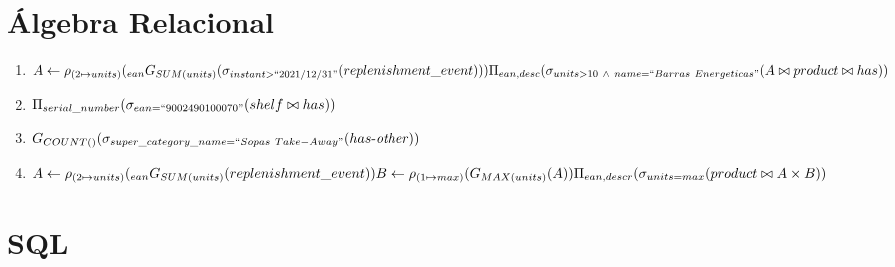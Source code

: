 \documentclass{article}
\newcommand{\select}{\sigma}
\newcommand{\project}{\Pi}
\newcommand{\njoin}{\bowtie}
\newcommand{\rename}{\rho}
\newcommand{\aggregatefn}{\mbox{$G$}}
\begin{document}
	\pagebreak

	\section*{Álgebra Relacional}

	\newcommand\responsiblefor{\mathop{\mbox{$responsible$-$\mathit{for}$}}}
	\newcommand\hasother{\mathop{\mbox{$has$-$\mathit{other}$}}}

	\begin{enumerate}[label=\arabic*)]

		\item $A \leftarrow \rename_{(2 \mapsto units)}(_{ean} \aggregatefn_{SUM(units)}(\select_{instant > ``2021/12/31"}(replenishment\_event)))\\
		       \project_{ean, desc}(\select_{units > 10\ \wedge\ name = ``Barras\ Energeticas"}(A \njoin product \njoin has))$

		\item $\project_{serial\_number}(\select_{ean = ``9002490100070"}(shelf \njoin has))$

		\item $\aggregatefn_{COUNT()}(\select_{super\_category\_name = ``Sopas\ Take-Away"}(\hasother))$

		\item $A \leftarrow \rename_{(2 \mapsto units)}(_{ean}\aggregatefn_{SUM(units)}(replenishment\_event))\\
		       B \leftarrow \rename_{(1 \mapsto max)}(\aggregatefn_{MAX(units)}(A))\\
		       \project_{ean, descr}(\select_{units=max}(product \njoin A \times B))$

	\end{enumerate}

	\vspace{5mm}

	\section*{SQL}
\end{document}
